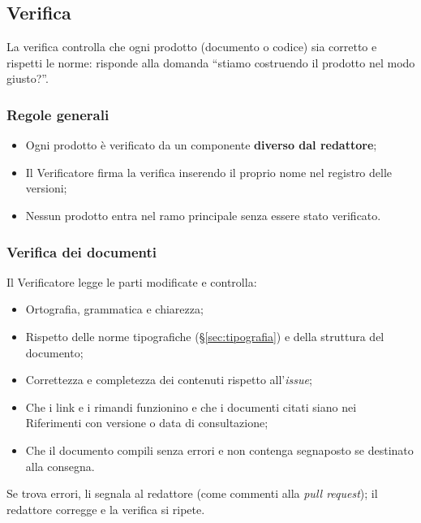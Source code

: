 \documentclass[12pt,a4paper]{article}
\newcommand{\tightlist}{\setlength{\itemsep}{1pt}\setlength{\parskip}{0pt}}
\begin{document}
\subsection{Verifica}
La verifica controlla che ogni prodotto (documento o codice) sia corretto e rispetti le norme: risponde alla domanda ``stiamo costruendo il prodotto nel modo giusto?''.

\subsubsection{Regole generali}
\begin{itemize}
\tightlist
\item Ogni prodotto è verificato da un componente \textbf{diverso dal redattore};
\item Il Verificatore firma la verifica inserendo il proprio nome nel registro delle versioni;
\item Nessun prodotto entra nel ramo principale senza essere stato verificato.
\end{itemize}

\subsubsection{Verifica dei documenti}
Il Verificatore legge le parti modificate e controlla:
\begin{itemize}
\tightlist
\item Ortografia, grammatica e chiarezza;
\item Rispetto delle norme tipografiche (§\ref{sec:tipografia}) e della struttura del documento;
\item Correttezza e completezza dei contenuti rispetto all'\emph{issue};
\item Che i link e i rimandi funzionino e che i documenti citati siano nei Riferimenti con versione o data di consultazione;
\item Che il documento compili senza errori e non contenga segnaposto se destinato alla consegna.
\end{itemize}
Se trova errori, li segnala al redattore (come commenti alla \emph{pull request}); il redattore corregge e la verifica si ripete.
\end{document}
